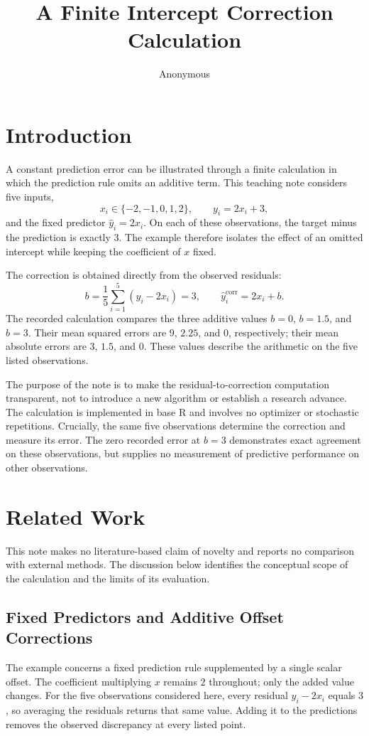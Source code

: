 \documentclass[11pt]{article}
\title{A Finite Intercept Correction Calculation}
\author{Anonymous}
\date{}
\begin{document}
\maketitle
\begin{abstract}
\end{abstract}
\section{Introduction}
A constant prediction error can be illustrated through a finite calculation in which the prediction rule omits an additive term. This teaching note considers five inputs,
\[
x_i \in \{-2,-1,0,1,2\},
\qquad y_i=2x_i+3,
\]
and the fixed predictor $\hat{y}_i=2x_i$. On each of these observations, the target minus the prediction is exactly $3$. The example therefore isolates the effect of an omitted intercept while keeping the coefficient of $x$ fixed.

The correction is obtained directly from the observed residuals:
\[
b=\frac{1}{5}\sum_{i=1}^{5}(y_i-2x_i)=3,
\qquad
\hat{y}_i^{\mathrm{corr}}=2x_i+b.
\]
The recorded calculation compares the three additive values $b=0$, $b=1.5$, and $b=3$. Their mean squared errors are $9$, $2.25$, and $0$, respectively; their mean absolute errors are $3$, $1.5$, and $0$. These values describe the arithmetic on the five listed observations.

The purpose of the note is to make the residual-to-correction computation transparent, not to introduce a new algorithm or establish a research advance. The calculation is implemented in base R and involves no optimizer or stochastic repetitions. Crucially, the same five observations determine the correction and measure its error. The zero recorded error at $b=3$ demonstrates exact agreement on these observations, but supplies no measurement of predictive performance on other observations.

\section{Related Work}
This note makes no literature-based claim of novelty and reports no comparison with external methods. The discussion below identifies the conceptual scope of the calculation and the limits of its evaluation.

\subsection{Fixed Predictors and Additive Offset Corrections}
The example concerns a fixed prediction rule supplemented by a single scalar offset. The coefficient multiplying $x$ remains $2$ throughout; only the added value changes. For the five observations considered here, every residual $y_i-2x_i$ equals $3$, so averaging the residuals returns that same value. Adding it to the predictions removes the observed discrepancy at every listed point.
\end{document}

